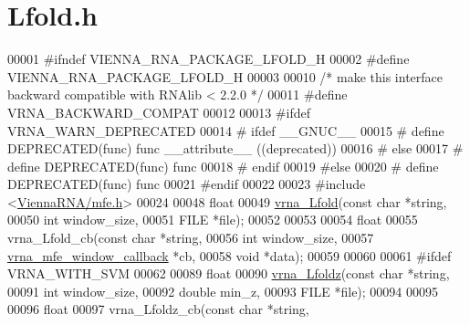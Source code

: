 \hypertarget{Lfold_8h_source}{}\section{Lfold.\+h}
\label{Lfold_8h_source}

\begin{DoxyCode}
00001 \textcolor{preprocessor}{#ifndef VIENNA\_RNA\_PACKAGE\_LFOLD\_H}
00002 \textcolor{preprocessor}{#define VIENNA\_RNA\_PACKAGE\_LFOLD\_H}
00003 
00010 \textcolor{comment}{/* make this interface backward compatible with RNAlib < 2.2.0 */}
00011 \textcolor{preprocessor}{#define VRNA\_BACKWARD\_COMPAT}
00012 
00013 \textcolor{preprocessor}{#ifdef VRNA\_WARN\_DEPRECATED}
00014 \textcolor{preprocessor}{# ifdef \_\_GNUC\_\_}
00015 \textcolor{preprocessor}{#  define DEPRECATED(func) func \_\_attribute\_\_ ((deprecated))}
00016 \textcolor{preprocessor}{# else}
00017 \textcolor{preprocessor}{#  define DEPRECATED(func) func}
00018 \textcolor{preprocessor}{# endif}
00019 \textcolor{preprocessor}{#else}
00020 \textcolor{preprocessor}{# define DEPRECATED(func) func}
00021 \textcolor{preprocessor}{#endif}
00022 
00023 \textcolor{preprocessor}{#include <\hyperlink{mfe_8h}{ViennaRNA/mfe.h}>}
00024 
00048 \textcolor{keywordtype}{float}
00049 \hyperlink{group__local__mfe__fold_ga4918cce52bf69c1913cda503b2ac75d8}{vrna\_Lfold}(\textcolor{keyword}{const} \textcolor{keywordtype}{char} *\textcolor{keywordtype}{string},
00050            \textcolor{keywordtype}{int}        window\_size,
00051            FILE       *file);
00052 
00053 
00054 \textcolor{keywordtype}{float}
00055 vrna\_Lfold\_cb(\textcolor{keyword}{const} \textcolor{keywordtype}{char}                *\textcolor{keywordtype}{string},
00056               \textcolor{keywordtype}{int}                       window\_size,
00057               \hyperlink{group__mfe__fold_ga4f3e5bc214ef803074ace313cb9571b4}{vrna\_mfe\_window\_callback}  *cb,
00058               \textcolor{keywordtype}{void}                      *data);
00059 
00060 
00061 \textcolor{preprocessor}{#ifdef VRNA\_WITH\_SVM}
00062 
00089 \textcolor{keywordtype}{float}
00090 \hyperlink{group__local__mfe__fold_ga27fddda5fc63eb49c861e38845fc34b4}{vrna\_Lfoldz}(\textcolor{keyword}{const} \textcolor{keywordtype}{char}  *\textcolor{keywordtype}{string},
00091             \textcolor{keywordtype}{int}         window\_size,
00092             \textcolor{keywordtype}{double}      min\_z,
00093             FILE        *file);
00094 
00095 
00096 \textcolor{keywordtype}{float}
00097 vrna\_Lfoldz\_cb(\textcolor{keyword}{const} \textcolor{keywordtype}{char}                       *\textcolor{keywordtype}{string},

\end{DoxyCode}

